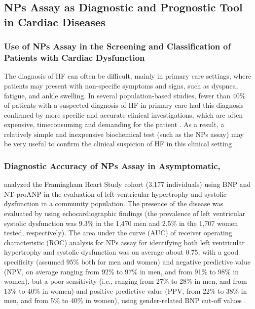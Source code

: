 \documentclass[14pt,a4paper,onecolumn]{extarticle}
\begin{document}
\subsection{ NPs Assay as Diagnostic and Prognostic Tool in Cardiac Diseases}



\subsubsection{ Use of NPs Assay in the Screening and Classification of Patients with Cardiac Dysfunction}



The diagnosis of HF can often be difficult, mainly in primary care settings, where patients may present with non-specific symptoms and signs, such as dyspnea, fatigue, and ankle swelling. In several population-based studies, fewer than 40\% of patients with a suspected diagnosis of HF in primary care had this diagnosis confirmed by more specific and accurate clinical investigations, which are often expensive, timeconsuming and demanding for the patient \citep{bib369} \citep{bib370} \citep{bib3105}. As a result, a relatively simple and inexpensive biochemical test (such as the NPs assay) may be very useful to confirm the clinical suspicion of HF in this clinical setting \citep{bib35} \citep{bib3131} \citep{bib335}.



\subsubsection{ Diagnostic Accuracy of NPs Assay in Asymptomatic,}


\citep{bib39} analyzed the Framingham Heart Study cohort (3,177 individuals) using BNP and NT-proANP in the evaluation of left ventricular hypertrophy and systolic dysfunction in a community population.  The presence of the disease was evaluated by using echocardiographic findings (the prevalence of left ventricular systolic dysfunction was 9.3\% in the 1,470 men and 2.5\% in the 1,707 women tested, respectively). The area under the curve (AUC) of receiver operating characteristic (ROC) analysis for NPs assay for identifying both left ventricular hypertrophy and systolic dysfunction was on average about 0.75, with a good specificity (assumed 95\% both for men and women) and negative predictive value (NPV, on average ranging from 92\% to 97\% in men, and from 91\% to 98\% in women), but a poor sensitivity (i.e., ranging from 27\% to 28\% in men, and from 13\% to 40\% in women) and positive predictive value (PPV, from 22\% to 38\% in men, and from 5\% to 40\% in women), using gender-related BNP cut-off values \citep{bib39}.
\end{document}
